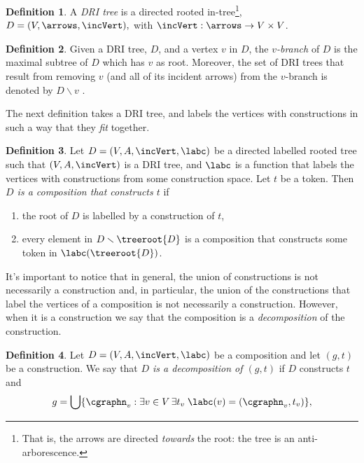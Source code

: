\documentclass[a4paper]{article}
\theoremstyle{definition}
\newtheorem{definition}{Definition}
\begin{document}
		\begin{definition}\label{defn:decompositionTree}
			A \textit{DRI tree} is a directed rooted in-tree\footnote{That is, the arrows are directed \textit{towards} the root: the tree is an anti-arborescence.},
			$D=(V,\arrows, \incVert),$ with $\incVert : \arrows\to V\times V$.
		\end{definition}
	
	\begin{definition}
		Given a DRI tree, $D$, and a vertex $v$ in $D$, the \textit{$v$-branch} of $D$ is the maximal subtree of $D$ which has $v$ as root. Moreover, the set of DRI trees that result from removing $v$ (and all of its incident arrows) from the $v$-branch is denoted by $D \smallsetminus v$ .
	\end{definition}
	The next definition takes a DRI tree, and labels the vertices with constructions in such a way that they \textit{fit} together.
	\begin{definition}
		Let $D = (V,A,\incVert,\labc)$ be a directed labelled rooted tree such that $(V,A,\incVert)$ is a DRI tree, and $\labc$ is a function that labels the vertices with constructions from some construction space. Let $t$ be a token. Then \textit{$D$ is a composition that constructs $t$} if
		\begin{enumerate}[itemsep=2pt]
			\item the root of $D$ is labelled by a construction of $t$,
			\item every element in $D \smallsetminus \treeroot{D}$ is a composition that constructs some token in $\labc(\treeroot{D})$.
		\end{enumerate}
	\end{definition}
	It's important to notice that in general, the union of constructions is not necessarily a construction and, in particular, the union of the constructions that label the vertices of a composition is not necessarily a construction. However, when it is a construction we say that the composition is a \textit{decomposition} of the construction.
		
	
		\begin{definition}\label{defn:constructionOfD}
			Let $D = (V,A,\incVert,\labc)$ be a composition and let $(g,t)$ be a construction. We say that \textit{$D$ is a decomposition of $(g,t)$} if $D$ constructs $t$ and 
			\begin{displaymath}
			g=\bigcup \{\cgraphn_v: \exists v\in V \thinspace \exists t_v \thickspace \labc(v)=(\cgraphn_v,t_v)\},
			\end{displaymath}
		\end{definition}
	
\end{document}
